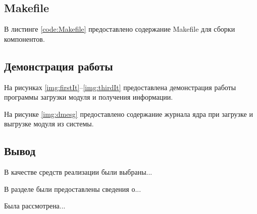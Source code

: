 \subsection{Makefile}
В листинге \ref{code:Makefile} предоставлено содержание Makefile для сборки компонентов.

\newpage
{}

\subsection{Демонстрация работы}
На рисунках \ref{img:firstIt}--\ref{img:thirdIt} предоставлена демонстрация работы программы загрузки модуля и получения информации.

На рисунке \ref{img:dmesg} предоставлено содержание журнала ядра при загрузке и выгрузке модуля из системы.



\subsection*{Вывод}
В качестве средств реализации были выбраны...

В разделе были предоставлены сведения о...

Была рассмотрена...